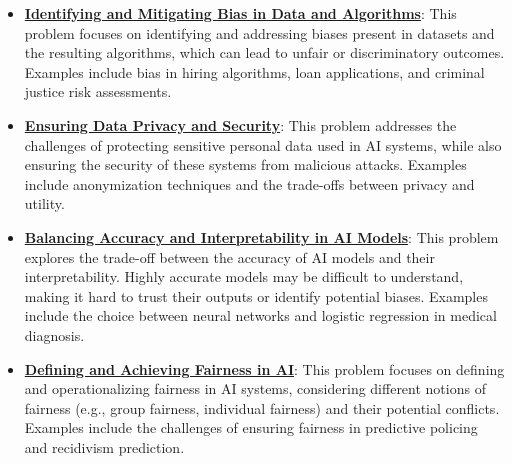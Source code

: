 \documentclass{article}%
\begin{document}
\begin{itemize}[leftmargin=*]%
\item \href{https://www.math.purdue.edu/~yipn/351/16L2-ethics.pdf#page=2}{\textbf{Identifying and Mitigating Bias in Data and Algorithms}}: This problem focuses on identifying and addressing biases present in datasets and the resulting algorithms, which can lead to unfair or discriminatory outcomes. Examples include bias in hiring algorithms, loan applications, and criminal justice risk assessments.%
\item \href{https://www.math.purdue.edu/~yipn/351/16L2-ethics.pdf#page=10}{\textbf{Ensuring Data Privacy and Security}}: This problem addresses the challenges of protecting sensitive personal data used in AI systems, while also ensuring the security of these systems from malicious attacks. Examples include anonymization techniques and the trade-offs between privacy and utility.%
\item \href{https://www.math.purdue.edu/~yipn/351/16L2-ethics.pdf#page=28}{\textbf{Balancing Accuracy and Interpretability in AI Models}}: This problem explores the trade-off between the accuracy of AI models and their interpretability. Highly accurate models may be difficult to understand, making it hard to trust their outputs or identify potential biases. Examples include the choice between neural networks and logistic regression in medical diagnosis.%
\item \href{https://www.math.purdue.edu/~yipn/351/16L2-ethics.pdf#page=18}{\textbf{Defining and Achieving Fairness in AI}}: This problem focuses on defining and operationalizing fairness in AI systems, considering different notions of fairness (e.g., group fairness, individual fairness) and their potential conflicts. Examples include the challenges of ensuring fairness in predictive policing and recidivism prediction.%
\end{itemize}

%
\end{document}
